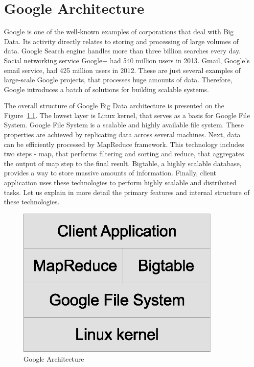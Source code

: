 \chapter{Google Architecture}
\label{chap:google_architecture}

Google is one of the well-known examples of corporations that deal with Big Data.
Its activity directly relates to storing and processing of large volumes of data.
Google Search engine handles more than three billion searches every day.
Social networking service Google+ had 540 million users in 2013.
Gmail, Google's email service, had 425 million users in 2012.
These are just several examples of large-scale Google projects, that processes huge amounts of data.
Therefore, Google introduces a batch of solutions for building scalable systems. 

The overall structure of Google Big Data architecture is presented on the
Figure~\ref{fig:google_architecture}.
The lowest layer is Linux kernel, that serves as a basis for Google File System.
Google File System is a scalable and highly available file system. 
These properties are achieved by replicating data across several machines.
Next, data can be efficiently processed by MapReduce framework.
This technology includes two steps - map, that performs filtering and sorting and reduce, that aggregates the output of map step to the final result.
Bigtable, a highly scalable database, provides a way to store massive amounts of information.
Finally, client application uses these technologies to perform highly scalable and distributed tasks.  
Let us explain in more detail the primary features and internal structure of these technologies.

\begin{figure}
  \centering
  \includegraphics [width=0.9\textwidth]{images/Google_architecture}
  \caption{Google Architecture}
  \label{fig:google_architecture}
\end{figure}

